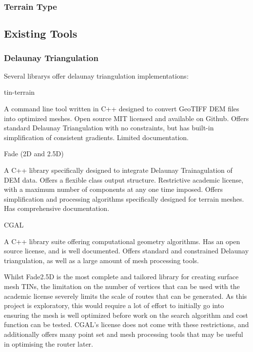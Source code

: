 \documentclass[12pt]{article}
\begin{document}
\subsubsection{Terrain Type}

\subsection{Existing Tools}

\subsubsection{Delaunay Triangulation}

Several librarys offer delaunay triangulation implementations:

\begin{itemize}

  \itemize tin-terrain

  A command line tool written in C++ designed to convert GeoTIFF DEM files into optimized meshes. Open source MIT licensed and available on Github. Offers standard Delaunay Triangulation with no constraints, but has built-in simplification of consistent gradients. Limited documentation.

  \itemize Fade (2D and 2.5D)

  A C++ library specifically designed to integrate Delaunay Trainagulation of DEM data. Offers a flexible class output structure. Restrictive academic license, with a maximum number of components at any one time imposed. Offers simplification and processing algorithms specifically designed for terrain meshes. Has comprehensive documentation.

  \itemize CGAL

  A C++ library suite offering computational geometry algorithms. Has an open source license, and is well documented. Offers standard and constrained Delaunay triangulation, as well as a large amount of mesh processing tools.

\end{itemize}

Whilst Fade2.5D is the most complete and tailored library for creating surface mesh TINs, the limitation on the number of vertices that can be used with the academic license severely limits the scale of routes that can be generated. As this project is exploratory, this would require a lot of effort to initially go into ensuring the mesh is well optimized before work on the search algorithm and cost function can be tested. CGAL's license does not come with these restrictions, and additionally offers many point set and mesh processing tools that may be useful in optimising the router later.
\end{document}
